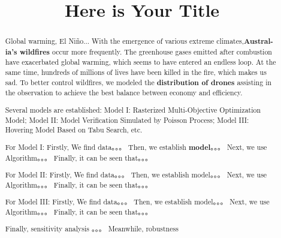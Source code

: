 \documentclass[12pt]{ctexart}
\title{Here is Your Title}  %
\begin{document}
\begin{abstract}
  Global warming, El Niño... With the emergence of various extreme climates,\textbf{Austral-ia's wildfires} occur more frequently. The greenhouse gases emitted after combustion have exacerbated global warming, which seems to have entered an endless loop. At the same time, hundreds of millions of lives have been killed in the fire, which makes us sad. To better control wildfires, we modeled the \textbf{distribution of drones} assisting in the observation to achieve the best balance between economy and efficiency.

  Several models are established: Model I: Rasterized Multi-Objective Optimization Model; Model II: Model Verification Simulated by Poisson Process; Model III: Hovering Model Based on Tabu Search, etc.

  For Model I:
  Firstly,%
  We find data。。。
  Then,%
  we establish \textbf{model}。。。
  Next,%
  we use Algorithm。。。
  Finally,%
  it can be seen that。。。

  For Model II:
  Firstly,%
  We find data。。。
  Then,%
  we establish model。。。
  Next,%
  we use Algorithm。。。
  Finally,%
  it can be seen that。。。

  For Model III:
  Firstly,%
  We find data。。。
  Then,%
  we establish model。。。
  Next,%
  we use Algorithm。。。
  Finally,%
  it can be seen that。。。

  Finally, sensitivity analysis 。。。 Meanwhile, robustness


\end{abstract}
\end{document}
